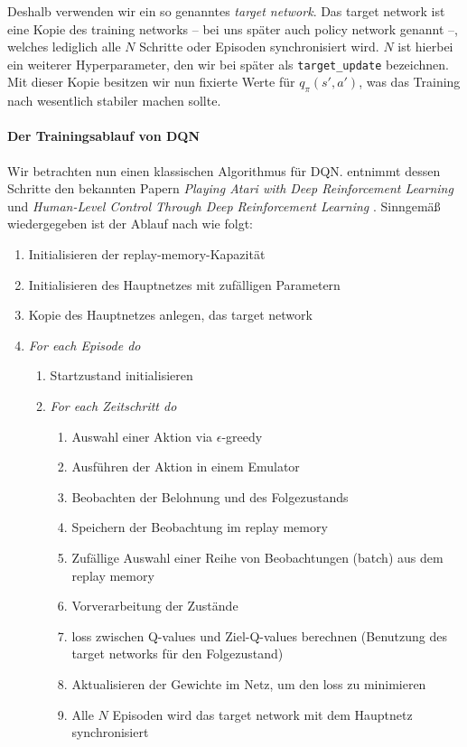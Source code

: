 Deshalb verwenden wir ein so genanntes \textit{target network}. Das target network ist eine Kopie des training networks -- bei uns später auch policy network genannt --, welches lediglich alle $ N $ Schritte oder Episoden synchronisiert wird. $ N $ ist hierbei ein weiterer Hyperparameter, den wir bei später als \texttt{target_update} bezeichnen. Mit dieser Kopie besitzen wir nun fixierte Werte für $ q_\pi(s', a') $, was das Training nach \cite{11_maxim2018deeprl} wesentlich stabiler machen sollte.

\paragraph{Der Trainingsablauf von DQN}
Wir betrachten nun einen klassischen Algorithmus für DQN. \cite{11_maxim2018deeprl} entnimmt dessen Schritte den bekannten Papern \textit{Playing Atari with Deep Reinforcement Learning} \cite{13_mnih2013atari} und \textit{Human-Level Control Through Deep Reinforcement Learning} \cite{12_mnih2015humanlevel}. Sinngemäß wiedergegeben ist der Ablauf nach \cite{12_mnih2015humanlevel} wie folgt:
\begin{enumerate}[nosep]
    \item Initialisieren der replay-memory-Kapazität
    \item Initialisieren des Hauptnetzes mit zufälligen Parametern
    \item Kopie des Hauptnetzes anlegen, das target network
    \item \textit{For each Episode do}
    \begin{enumerate}
        \item Startzustand initialisieren
        \item \textit{For each Zeitschritt do}
        \begin{enumerate}
            \item Auswahl einer Aktion via $ \epsilon $-greedy
            \item Ausführen der Aktion in einem Emulator
            \item Beobachten der Belohnung und des Folgezustands
            \item Speichern der Beobachtung im replay memory
            \item Zufällige Auswahl einer Reihe von Beobachtungen (batch) aus dem replay memory
            \item Vorverarbeitung der Zustände
            \item loss zwischen Q-values und Ziel-Q-values berechnen (Benutzung des target networks für den Folgezustand) %
            \item Aktualisieren der Gewichte im Netz, um den loss zu minimieren
            \item Alle $ N $ Episoden wird das target network mit dem Hauptnetz synchronisiert
        \end{enumerate}
    \end{enumerate}
\end{enumerate}

